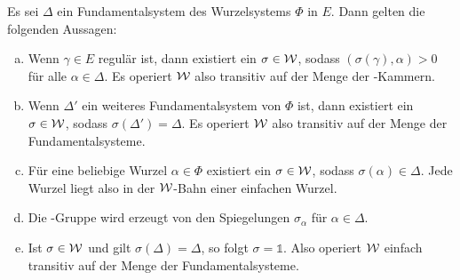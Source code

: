 \begin{thm}
  \label{thm:simplyTransitive}
  Es sei $\Delta$ ein Fundamentalsystem des Wurzelsystems $\Phi$ in $E$.
  Dann gelten die folgenden Aussagen:
  \begin{enumerate}[(a)]

    \item Wenn $\gamma \in E$ regulär ist, dann existiert ein $\sigma \in \mathcal{W}$, sodass $(\sigma(\gamma), \alpha) > 0$ für alle $\alpha \in \Delta$. 
      Es operiert $\mathcal{W}$ also transitiv auf der Menge der \weyl\hyp{}Kammern.

    \item Wenn $\Delta'$ ein weiteres Fundamentalsystem von $\Phi$ ist, dann existiert ein $\sigma \in \mathcal{W}$, sodass $\sigma(\Delta') = \Delta$.
      Es operiert $\mathcal{W}$ also transitiv auf der Menge der Fundamentalsysteme.

    \item Für eine beliebige Wurzel $\alpha \in \Phi$ existiert ein $\sigma \in \mathcal{W}$, sodass $\sigma(\alpha) \in \Delta$.
      Jede Wurzel liegt also in der $\mathcal{W}$\hyp{}Bahn einer einfachen Wurzel.
    \item Die \weyl\hyp{}Gruppe wird erzeugt von den Spiegelungen $\sigma_\alpha$ für $\alpha \in \Delta$.

    \item Ist $\sigma \in \mathcal{W}$ und gilt $\sigma(\Delta) = \Delta$, so folgt $\sigma = \mathds{1}$.
      Also operiert $\mathcal{W}$ einfach transitiv auf der Menge der Fundamentalsysteme.
  \end{enumerate}
\end{thm}

